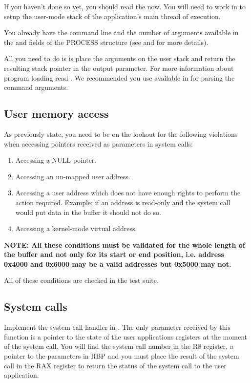 If you haven't done so yet, you should read the  now. You will need to work in
 to setup the user-mode stack of the application's main
thread of execution.

You already have the command line and the number of arguments available in the 
and  fields of the PROCESS structure (see  and
 for more details).

All you need to do is is place the arguments on the user stack and return the resulting stack
pointer in the  output parameter. For more information about program loading
read . We recommended you use  available in 
for parsing the command arguments.

\subsection{User memory access}

As previously state, you need to be on the lookout for the following violations when accessing
pointers received as parameters in system calls:
\begin{enumerate}
	\item Accessing a NULL pointer.
	\item Accessing an un-mapped user address.
	\item Accessing a user address which does not have enough rights to perform the action required.
Example: if an address is read-only and the system call would put data in the buffer it should not
do so.
	\item Accessing a kernel-mode virtual address.
\end{enumerate}

\textbf{NOTE: All these conditions must be validated for the whole length of the buffer and not only
for its start or end position, i.e. address 0x4000 and 0x6000 may be a valid addresses but 0x5000
may not.}

All of these conditions are checked in the test suite.

\subsection{System calls}

Implement the system call handler in . The only parameter received by this
function is a pointer to the state of the user applications registers at the moment of the system
call. You will find the system call number in the R8 register, a pointer to the parameters in RBP
and you must place the result of the system call in the RAX register to return the status of the
system call to the user application.

